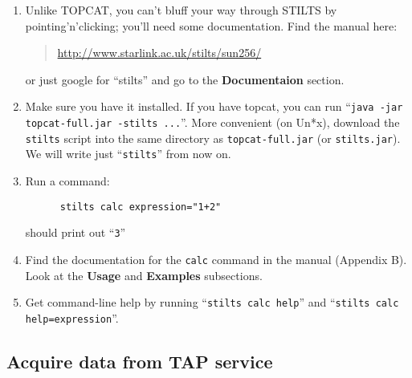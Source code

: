 \documentclass{article}
\newcommand{\lab}[1]{{\bf #1}}
\newcommand{\turl}[1]{{\color{blue}\url{#1}}}
\begin{document}
\begin{enumerate}
\item Unlike TOPCAT, you can't bluff your way through STILTS
      by pointing'n'clicking; you'll need some documentation.
      Find the manual here:
      \begin{quote}
        \turl{http://www.starlink.ac.uk/stilts/sun256/}
      \end{quote}
      or just google for ``stilts'' and go to the \lab{Documentaion} section.
\item Make sure you have it installed.  If you have topcat, you can
      run ``{\tt java -jar topcat-full.jar -stilts ...}''.
      More convenient (on Un*x), download the {\tt stilts} script
      into the same directory as {\tt topcat-full.jar} (or {\tt stilts.jar}).
      We will write just ``{\tt stilts}'' from now on.
\item Run a command:
      \vspace*{-2ex}
      \begin{verbatim}
      stilts calc expression="1+2"
      \end{verbatim}
      \vspace*{-4ex}
      should print out ``{\tt 3}''
\item Find the documentation for the {\tt calc} command in the manual
      (Appendix B).
      Look at the \lab{Usage} and \lab{Examples} subsections.
\item Get command-line help by running ``{\tt stilts calc help}'' and
      ``{\tt stilts calc help=expression}''.
\end{enumerate}

\subsection{Acquire data from TAP service}
\end{document}
